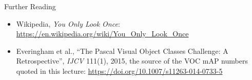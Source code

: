 \begin{frame}{Further Reading}
    \begin{itemize}
        \item Wikipedia, \emph{You Only Look Once}: \url{https://en.wikipedia.org/wiki/You_Only_Look_Once}
        \item Everingham et al., ``The Pascal Visual Object Classes Challenge: A Retrospective'', \emph{IJCV} 111(1), 2015, the source of the VOC mAP numbers quoted in this lecture: \url{https://doi.org/10.1007/s11263-014-0733-5}
    \end{itemize}
\end{frame}